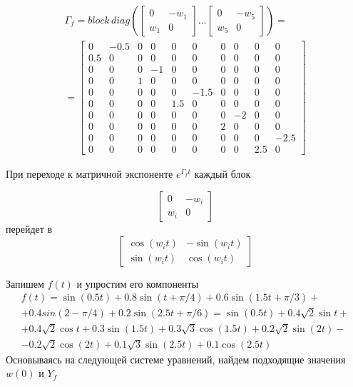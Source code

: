 \begin{multline}
    \Gamma_f = block \,diag \left( 
    \begin{bmatrix}
        0 & -w_1\\
        w_1 & 0
    \end{bmatrix}\dots 
    \begin{bmatrix}
        0 & -w_5\\
        w_5 & 0
    \end{bmatrix}
    \right) =\\[2ex]
    = \begin{bmatrix}
        0 & -0.5 & 0 & 0 & 0 & 0 & 0 & 0&0&0\\
        0.5 & 0 & 0 & 0 & 0 & 0 & 0 & 0&0&0\\
        0 & 0 & 0 & -1 & 0 & 0 & 0 & 0&0&0\\
        0 & 0 & 1 & 0 & 0 & 0 & 0 & 0&0&0\\
        0 & 0 & 0 & 0 & 0 & -1.5 & 0 & 0&0&0\\
        0 & 0 & 0 & 0 & 1.5 & 0 & 0 & 0&0&0\\
        0 & 0 & 0 & 0 & 0 & 0 & 0 & -2&0&0\\
        0 & 0 & 0 & 0 & 0 & 0 & 2 & 0&0&0\\
        0 & 0 & 0 & 0 & 0 & 0 & 0 & 0&0&-2.5\\
        0 & 0 & 0 & 0 & 0 & 0 & 0 & 0&2.5&0
    \end{bmatrix} 
\end{multline}

При переходе к матричной экспоненте $e^{\Gamma_f t}$ каждый блок 

\begin{equation}\begin{bmatrix}
        0 & -w_i\\
        w_i & 0
\end{bmatrix}\end{equation}
перейдет в 
\begin{equation}\begin{bmatrix}
        \cos (w_it) & -\sin (w_it)\\
        \sin (w_it) & \cos (w_it)
\end{bmatrix}
\end{equation}
    
Запишем $f(t)$ и упростим его компоненты
\begin{multline}
    f(t) = \sin (0.5t) + 0.8 \sin(t+\pi/4)+ 0.6 \sin (1.5 t+ \pi/3)+\\+0.4 sin(2-\pi/4) + 0.2\sin(2.5t+\pi/6) =\sin (0.5t)+ 0.4\sqrt{2} \sin{t} +\\+ 0.4\sqrt{2} \cos{t} + 0.3 \sin(1.5t)+
    0.3 \sqrt{3} \cos(1.5t) + 0.2 \sqrt{2} \sin(2t) - \\-0.2\sqrt{2}\cos(2t) + 0.1 \sqrt{3} \sin(2.5t) + 0.1 \cos(2.5t)
\end{multline}
Основываясь на следующей системе уравнений, найдем подходящие значения $w(0)$ и $Y_f$

